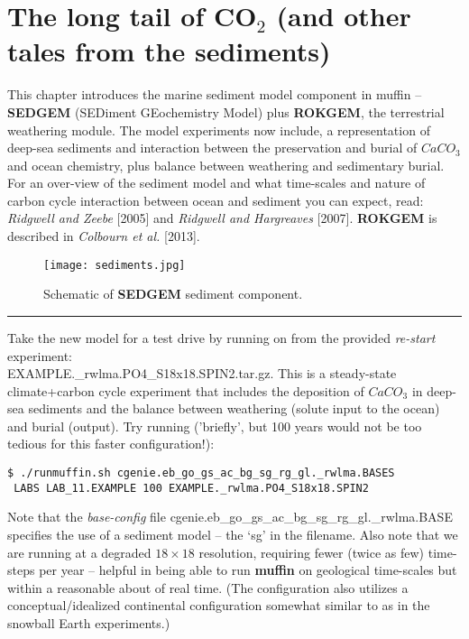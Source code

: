\documentclass[11pt,fleqn]{book} %
\begin{document}

\newpage


\section{The long tail of CO$_{2}$ (and other tales from the sediments)}

This chapter introduces the marine sediment model component in muffin -- \textbf{SEDGEM} (SEDiment GEochemistry Model) plus \textbf{ROKGEM}, the terrestrial weathering module. The model experiments now include, a representation of deep-sea sediments and interaction between the preservation and burial of \(CaCO_{3}\) and ocean chemistry, plus balance between weathering and sedimentary burial. For an over-view of the sediment model and what time-scales and nature of carbon cycle interaction between ocean and sediment you can expect, read: \textit{Ridgwell and Zeebe} [2005] and \textit{Ridgwell and Hargreaves} [2007]. \textbf{ROKGEM} is described in \textit{Colbourn et al.} [2013].

\begin{figure}
\texttt{[image: sediments.jpg]}
\caption{Schematic of \textbf{SEDGEM} sediment component.}
\label{fig:sediments}
\end{figure}

\vspace{1mm}
\noindent\rule{4cm}{0.1mm}
\vspace{2mm}

\noindent Take the new model for a test drive by running on from the provided \textit{re-start} experiment: \\ \textsf{\footnotesize EXAMPLE.\_rwlma.PO4\_S18x18.SPIN2.tar.gz}. This is a steady-state climate+carbon cycle experiment that includes the deposition of \(CaCO_{3}\) in deep-sea sediments and the balance between weathering (solute input to the ocean) and burial (output). Try running ('briefly', but 100 years would not be too tedious for this faster configuration!):
\vspace{-2mm}\begin{verbatim}
$ ./runmuffin.sh cgenie.eb_go_gs_ac_bg_sg_rg_gl._rwlma.BASES 
 LABS LAB_11.EXAMPLE 100 EXAMPLE._rwlma.PO4_S18x18.SPIN2 
\end{verbatim}\vspace{-2mm}
Note that the \textit{base-config} file \textsf{\footnotesize cgenie.eb\_go\_gs\_ac\_bg\_sg\_rg\_gl.\_rwlma.BASE} specifies the use of a sediment model -- the ‘\textsf{\footnotesize sg}’ in the filename. 
Also note that we are running at a degraded \(18\times18\) resolution, requiring fewer (twice as few) time-steps per year -- helpful in being able to run \textbf{muffin} on geological time-scales but within a reasonable about of real time. (The configuration also utilizes a conceptual/idealized continental configuration somewhat similar to as in the snowball Earth experiments.)
\end{document}
